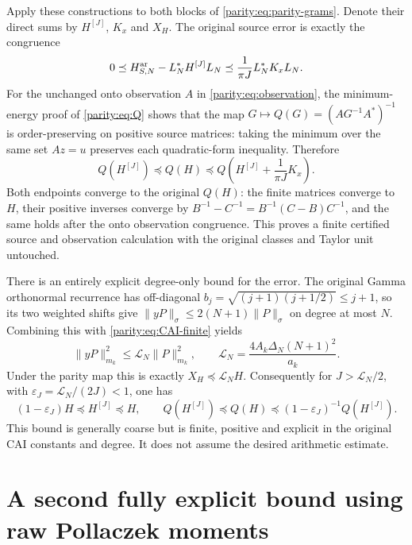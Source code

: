 Apply these constructions to both blocks of
\eqref{parity:eq:parity-grams}. Denote their direct sums by $H^{[J]}$,
$K_x$ and $X_H$. The original source error is exactly the
congruence
\[
 0\preceq H_{S,N}^{\rm ar}-L_N^*H^{[J]}L_N
       \preceq\frac1{\pi J}L_N^*K_xL_N.
\]
For the unchanged onto observation $A$ in \eqref{parity:eq:observation},
the minimum-energy proof of \eqref{parity:eq:Q} shows that the map
$G\mapsto Q(G)=(AG^{-1}A^*)^{-1}$ is order-preserving on positive
source matrices: taking the minimum over the same set $Az=u$
preserves each quadratic-form inequality. Therefore
\begin{equation}\label{parity:eq:Q-bracket}
 \boxed{Q(H^{[J]})\preceq Q(H)\preceq
 Q\left(H^{[J]}+\frac1{\pi J}K_x\right).}
\end{equation}
Both endpoints converge to the original $Q(H)$: the finite
matrices converge to $H$, their positive inverses converge by
$B^{-1}-C^{-1}=B^{-1}(C-B)C^{-1}$, and the same holds after
the onto observation congruence. This proves a finite certified
source and observation calculation with the original classes and
Taylor unit untouched.

There is an entirely explicit degree-only bound for the error.
The original Gamma orthonormal recurrence has off-diagonal
$b_j=\sqrt{(j+1)(j+1/2)}\leq j+1$, so its two weighted shifts
give $\|yP\|_\sigma\leq2(N+1)\|P\|_\sigma$ on degree at most $N$.
Combining this with \eqref{parity:eq:CAI-finite} yields
\begin{equation}\label{parity:eq:L-bound}
 \|yP\|_{m_k}^2\leq\mathcal L_N\|P\|_{m_k}^2,
 \qquad \mathcal L_N=
       \frac{4A_k\Delta_N(N+1)^2}{a_k}.
\end{equation}
Under the parity map this is exactly $X_H\preceq\mathcal L_NH$.
Consequently for $J>\mathcal L_N/2$, with
$\varepsilon_J=\mathcal L_N/(2J)<1$, one has
\begin{equation}\label{parity:eq:relative}
 (1-\varepsilon_J)H\preceq H^{[J]}\preceq H,
 \qquad
 Q(H^{[J]})\preceq Q(H)
       \preceq(1-\varepsilon_J)^{-1}Q(H^{[J]}).
\end{equation}
This bound is generally coarse but is finite, positive and
explicit in the original CAI constants and degree. It does not
assume the desired arithmetic estimate.

\section{A second fully explicit bound using raw Pollaczek moments}

